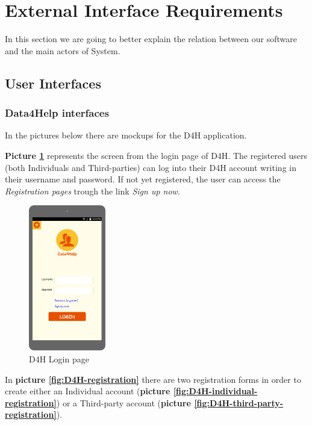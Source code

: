 \section{External Interface Requirements}

In this section we are going to better explain the relation between our software and the main actors of System.

\subsection{User Interfaces}

\subsubsection{Data4Help interfaces}
In the pictures below there are mockups for the D4H application.

\textbf{Picture \ref{fig:D4H-login-page}} represents the screen from the login page of D4H.  The registered users (both Individuals and Third-parties) can log into their D4H account writing in their username and password. If not yet registered, the user can access the \emph{Registration pages} trough the link \emph{Sign up now}.

\begin{figure}[H]
  \centering
  
  \includegraphics[width=0.30\textwidth]{pictures/mockup/D4H-login.png}
  \caption{D4H Login page}
  \label{fig:D4H-login-page}
\end{figure}


In \textbf{picture \ref{fig:D4H-registration}} there are two registration forms in order to create either an Individual account (\textbf{picture \ref{fig:D4H-individual-registration}}) or a Third-party account (\textbf{picture \ref{fig:D4H-third-party-registration}}).


